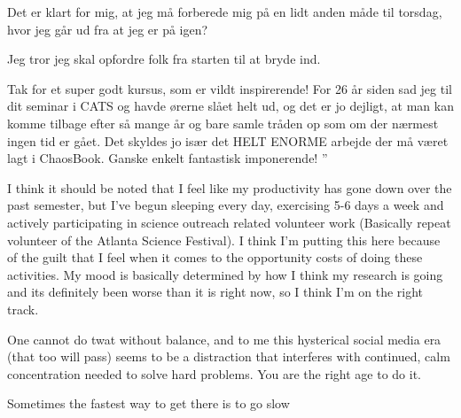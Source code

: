 \begin{description}
{\begin{description}
Det er klart for mig, at jeg m{\aa} forberede mig p{\aa} en lidt anden m{\aa}de til
torsdag, hvor jeg g{\aa}r ud fra at jeg er p{\aa} igen?

Jeg tror jeg skal opfordre folk fra starten til at bryde ind.

Tak for et super godt kursus, som er vildt inspirerende! For 26 {\aa}r siden
sad jeg til dit seminar i CATS og havde {\o}rerne sl{\aa}et helt ud, og det er
jo dejligt, at man kan komme tilbage efter s{\aa} mange {\aa}r og bare samle
tr{\aa}den op som om der n{\ae}rmest ingen tid er g{\aa}et. Det skyldes jo is{\ae}r det
HELT ENORME arbejde der m{\aa} v{\ae}ret lagt i ChaosBook. Ganske enkelt
fantastisk imponerende!
''

\item[balance]
I think it should be noted that I feel like my productivity has gone down over the past semester, but I've begun sleeping every day, exercising 5-6 days a week and actively participating in science outreach related volunteer work (Basically repeat volunteer of the Atlanta Science Festival). I think I'm putting this here because of the guilt that I feel when it comes to the
opportunity costs of doing these activities. My mood is basically determined
by how I think my research is going and its definitely been worse than it is right now, so I think I'm on the right track.

\item[mens sana in corpore sano] One cannot do twat without balance, and
to me this hysterical social media era (that too will pass) seems to be a
distraction that interferes with continued, calm concentration needed to
solve hard problems. You are the right age to do it.

 {Sometimes the fastest way to get there is to go slow}


\end{description}
}

\end{description}
